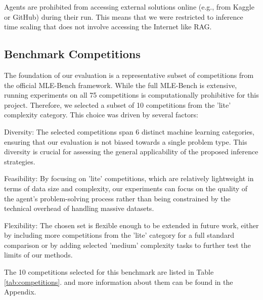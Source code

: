 Agents are prohibited from accessing external solutions online (e.g., from Kaggle or GitHub) during their run. This means that we were restricted to inference time scaling that does not involve accessing the Internet like RAG.

\subsection{Benchmark Competitions}

The foundation of our evaluation is a representative subset of competitions from the official MLE-Bench framework. While the full MLE-Bench is extensive, running experiments on all 75 competitions is computationally prohibitive for this project. Therefore, we selected a subset of 10 competitions from the 'lite' complexity category. This choice was driven by several factors:

Diversity: The selected competitions span 6 distinct machine learning categories, ensuring that our evaluation is not biased towards a single problem type. This diversity is crucial for assessing the general applicability of the proposed inference strategies. 

Feasibility: By focusing on 'lite' competitions, which are relatively lightweight in terms of data size and complexity, our experiments can focus on the quality of the agent's problem-solving process rather than being constrained by the technical overhead of handling massive datasets.

Flexibility: The chosen set is flexible enough to be extended in future work, either by including more competitions from the 'lite' category for a full standard comparison or by adding selected 'medium' complexity tasks to further test the limits of our methods.

The 10 competitions selected for this benchmark are listed in Table \ref{tab:competitions}. and more information about them can be found in the Appendix.

